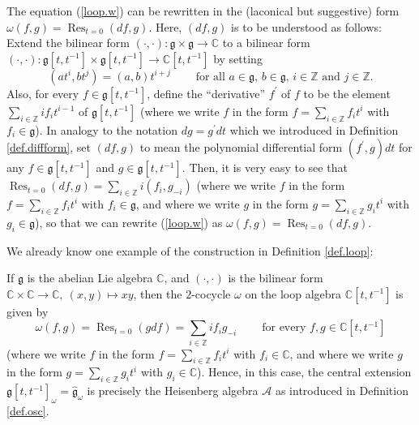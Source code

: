 \documentclass[etingof-lie.tex]{subfiles}
\begin{document}
\begin{remark}
The equation (\ref{loop.w}) can be rewritten in the (laconical but suggestive)
form $\omega\left(  f,g\right)  =\operatorname*{Res}\nolimits_{t=0}\left(
df,g\right)  $. Here, $\left(  df,g\right)  $ is to be understood as follows:
Extend the bilinear form $\left(  \cdot,\cdot\right)  :\mathfrak{g}%
\times\mathfrak{g}\rightarrow\mathbb{C}$ to a bilinear form $\left(
\cdot,\cdot\right)  :\mathfrak{g}\left[  t,t^{-1}\right]  \times
\mathfrak{g}\left[  t,t^{-1}\right]  \rightarrow\mathbb{C}\left[
t,t^{-1}\right]  $ by setting
\[
\left(  at^{i},bt^{j}\right)  =\left(  a,b\right)  t^{i+j}%
\ \ \ \ \ \ \ \ \ \ \text{for all }a\in\mathfrak{g}\text{, }b\in
\mathfrak{g}\text{, }i\in\mathbb{Z}\text{ and }j\in\mathbb{Z}.
\]
Also, for every $f\in\mathfrak{g}\left[  t,t^{-1}\right]  $, define the
``derivative'' $f^{\prime}$ of $f$ to be the element $\sum\limits_{i\in
\mathbb{Z}}if_{i}t^{i-1}$ of $\mathfrak{g}\left[  t,t^{-1}\right]  $ (where we
write $f$ in the form $f=\sum\limits_{i\in\mathbb{Z}}f_{i}t^{i}$ with
$f_{i}\in\mathfrak{g}$). In analogy to the notation $dg=g^{\prime}dt$ which we
introduced in Definition \ref{def.diffform}, set $\left(  df,g\right)  $ to
mean the polynomial differential form $\left(  f^{\prime},g\right)  dt$ for
any $f\in\mathfrak{g}\left[  t,t^{-1}\right]  $ and $g\in\mathfrak{g}\left[
t,t^{-1}\right]  $. Then, it is very easy to see that $\operatorname*{Res}%
\nolimits_{t=0}\left(  df,g\right)  =\sum\limits_{i\in\mathbb{Z}}i\left(
f_{i},g_{-i}\right)  $ (where we write $f$ in the form $f=\sum\limits_{i\in
\mathbb{Z}}f_{i}t^{i}$ with $f_{i}\in\mathfrak{g}$, and where we write $g$ in
the form $g=\sum\limits_{i\in\mathbb{Z}}g_{i}t^{i}$ with $g_{i}\in
\mathfrak{g}$), so that we can rewrite (\ref{loop.w}) as $\omega\left(
f,g\right)  =\operatorname*{Res}\nolimits_{t=0}\left(  df,g\right)  $.
\end{remark}

We already know one example of the construction in Definition \ref{def.loop}:

\begin{remark}
If $\mathfrak{g}$ is the abelian Lie algebra $\mathbb{C}$, and $\left(
\cdot,\cdot\right)  $ is the bilinear form $\mathbb{C}\times\mathbb{C}%
\rightarrow\mathbb{C},\ \left(  x,y\right)  \mapsto xy$, then the $2$-cocycle
$\omega$ on the loop algebra $\mathbb{C}\left[  t,t^{-1}\right]  $ is given by%
\[
\omega\left(  f,g\right)  =\operatorname*{Res}\nolimits_{t=0}\left(
gdf\right)  =\sum\limits_{i\in\mathbb{Z}}if_{i}g_{-i}%
\ \ \ \ \ \ \ \ \ \ \text{for every }f,g\in\mathbb{C}\left[  t,t^{-1}\right]
\]
(where we write $f$ in the form $f=\sum\limits_{i\in\mathbb{Z}}f_{i}t^{i}$
with $f_{i}\in\mathbb{C}$, and where we write $g$ in the form $g=\sum
\limits_{i\in\mathbb{Z}}g_{i}t^{i}$ with $g_{i}\in\mathbb{C}$). Hence, in this
case, the central extension $\mathfrak{g}\left[  t,t^{-1}\right]  _{\omega
}=\widehat{\mathfrak{g}}_{\omega}$ is precisely the Heisenberg algebra
$\mathcal{A}$ as introduced in Definition \ref{def.osc}.
\end{remark}
\end{document}
